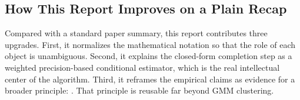 \subsection{How This Report Improves on a Plain Recap}
Compared with a standard paper summary, this report contributes three upgrades. First, it normalizes the mathematical notation so that the role of each object is unambiguous. Second, it explains the closed-form completion step as a weighted precision-based conditional estimator, which is the real intellectual center of the algorithm. Third, it reframes the empirical claims as evidence for a broader principle: . That principle is reusable far beyond GMM clustering.
